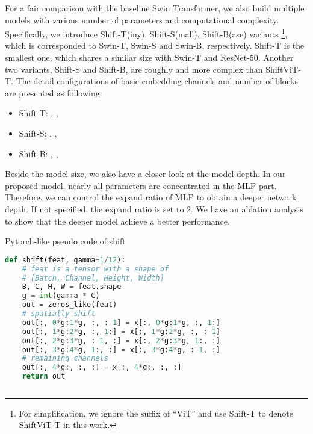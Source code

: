 \documentclass[letterpaper]{article} \usepackage{aaai22}  \usepackage{times}  \usepackage{helvet}  \usepackage{courier}  \usepackage[hyphens]{url}  \usepackage{graphicx} \usepackage{amsmath}
\begin{document}
For a fair comparison with the baseline Swin Transformer, we also build multiple models with various number of parameters and computational complexity. Specifically, we introduce Shift-T(iny), Shift-S(mall), Shift-B(ase) variants \footnote{For simplification, we ignore the suffix of ``ViT'' and use Shift-T to denote ShiftViT-T in this work.}, which is corresponded to Swin-T, Swin-S and Swin-B, respectively. Shift-T is the smallest one, which shares a similar size with Swin-T and ResNet-50. Another two variants, Shift-S and Shift-B, are roughly  and  more complex than ShiftViT-T. The detail configurations of basic embedding channels  and number of blocks  are presented as following:

\begin{itemize}
\item Shift-T: , , 
\item Shift-S: , , 
\item Shift-B: , , 
\end{itemize}

Beside the model size, we also have a closer look at the model depth. In our proposed model, nearly all parameters are concentrated in the MLP part. Therefore, we can control the expand ratio of MLP  to obtain a deeper network depth. If not specified, the expand ratio  is set to 2. We have an ablation analysis to show that the deeper model achieve a better performance.



\begin{algorithm}[t!]
\caption{Pytorch-like pseudo code of shift}
\label{alg:code}
\centering
{}
\begin{lstlisting}[language=python]
def shift(feat, gamma=1/12):
    # feat is a tensor with a shape of 
    # [Batch, Channel, Height, Width]
    B, C, H, W = feat.shape
    g = int(gamma * C)
    out = zeros_like(feat)
    # spatially shift
    out[:, 0*g:1*g, :, :-1] = x[:, 0*g:1*g, :, 1:]  
    out[:, 1*g:2*g, :, 1:] = x[:, 1*g:2*g, :, :-1]
    out[:, 2*g:3*g, :-1, :] = x[:, 2*g:3*g, 1:, :]
    out[:, 3*g:4*g, 1:, :] = x[:, 3*g:4*g, :-1, :]
    # remaining channels
    out[:, 4*g:, :, :] = x[:, 4*g:, :, :]
    return out
    
\end{lstlisting}
\end{algorithm}
\end{document}
